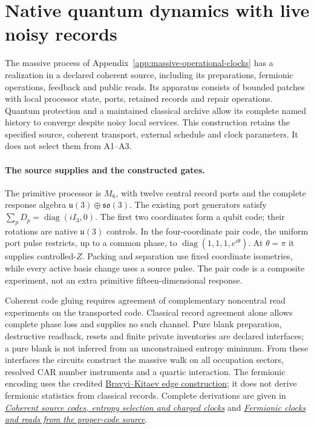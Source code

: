 \section{Native quantum dynamics with live noisy records}
\label{sec:noisy-native-source-refinement}

The massive process of Appendix~\ref{app:massive-operational-clocks} has
a realization in a declared coherent source, including its preparations,
fermionic operations, feedback and public reads. Its apparatus consists of
bounded patches with local processor state, ports, retained records and
repair operations. Quantum protection and a maintained classical archive
allow its complete named history to converge despite noisy local services.
This construction retains the specified source, coherent transport,
external schedule and clock parameters. It does not select them from
A1--A3.

\paragraph{The source supplies and the constructed gates.}
The primitive processor is $M_6$, with twelve central record ports and
the complete response algebra $\mathfrak u(3)\oplus\mathfrak{so}(3)$.
The existing port generators satisfy
$\sum_p D_p=\operatorname{diag}(iI_3,0)$.
The first two coordinates form a qubit code; their rotations are native
$\mathfrak u(3)$ controls. In the four-coordinate pair code, the uniform
port pulse restricts, up to a common phase, to
$\operatorname{diag}(1,1,1,e^{i\theta})$.
At $\theta=\pi$ it supplies controlled-$Z$. Packing and separation use
fixed coordinate isometries, while every active basis change uses a source
pulse. The pair code is a composite experiment, not an extra primitive
fifteen-dimensional response.

Coherent code gluing requires agreement of complementary noncentral read
experiments on the transported code. Classical record agreement alone
allows complete phase loss and supplies no such channel. Pure blank
preparation, destructive readback, resets and finite private inventories
are declared interfaces; a pure blank is not inferred from an unconstrained
entropy minimum. From these interfaces the circuits construct the massive
walk on all occupation sectors, resolved CAR number instruments and a
quartic interaction. The fermionic encoding uses the credited
\href{https://arxiv.org/abs/quant-ph/0003137}{Bravyi--Kitaev edge construction};
it does not derive fermionic statistics from classical records. Complete
derivations are given in
\href{https://github.com/FloatingPragma/observer-patch-holography/blob/r2055/docs/research/COHERENT_SOURCE_CLOCKS.md}{\emph{Coherent source codes, entropy selection and charged clocks}}
and
\href{https://github.com/FloatingPragma/observer-patch-holography/blob/r2055/docs/research/FERMIONIC_SOURCE_CLOCKS.md}{\emph{Fermionic clocks and reads from the proper-code source}}.

